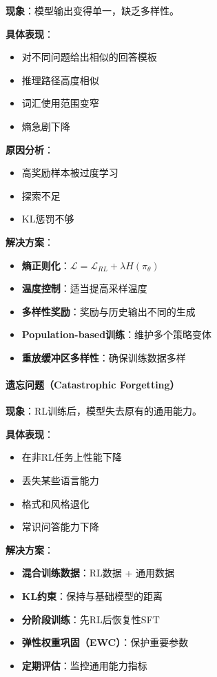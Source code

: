 \documentclass[12pt,a4paper]{article}
\begin{document}
\textbf{现象}：模型输出变得单一，缺乏多样性。

\textbf{具体表现}：
\begin{itemize}
    \item 对不同问题给出相似的回答模板
    \item 推理路径高度相似
    \item 词汇使用范围变窄
    \item 熵急剧下降
\end{itemize}

\textbf{原因分析}：
\begin{itemize}
    \item 高奖励样本被过度学习
    \item 探索不足
    \item KL惩罚不够
\end{itemize}

\textbf{解决方案}：
\begin{itemize}
    \item \textbf{熵正则化}：$\mathcal{L} = \mathcal{L}_{RL} + \lambda H(\pi_\theta)$
    \item \textbf{温度控制}：适当提高采样温度
    \item \textbf{多样性奖励}：奖励与历史输出不同的生成
    \item \textbf{Population-based训练}：维护多个策略变体
    \item \textbf{重放缓冲区多样性}：确保训练数据多样
\end{itemize}

\paragraph{遗忘问题（Catastrophic Forgetting）}

\textbf{现象}：RL训练后，模型失去原有的通用能力。

\textbf{具体表现}：
\begin{itemize}
    \item 在非RL任务上性能下降
    \item 丢失某些语言能力
    \item 格式和风格退化
    \item 常识问答能力下降
\end{itemize}

\textbf{解决方案}：
\begin{itemize}
    \item \textbf{混合训练数据}：RL数据 + 通用数据
    \item \textbf{KL约束}：保持与基础模型的距离
    \item \textbf{分阶段训练}：先RL后恢复性SFT
    \item \textbf{弹性权重巩固（EWC）}：保护重要参数
    \item \textbf{定期评估}：监控通用能力指标
\end{itemize}
\end{document}
